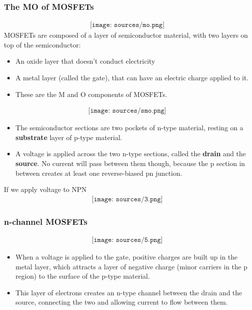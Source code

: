 \documentclass[12pt]{article}
\theoremstyle{definition}
\begin{document}
\subsubsection{The MO of MOSFETs}
\begin{align*}
    \texttt{[image: sources/mo.png]}
\end{align*}
MOSFETs are composed of a layer of semiconductor material, with two layers on top of the semiconductor:
\begin{itemize}
    \item An oxide layer that doesn't conduct electricity
    \item A metal layer (called the gate), that can have an electric charge applied to it.
    \item These are the M and O components of MOSFETs.
\end{itemize}
\begin{align*}
    \texttt{[image: sources/smo.png]}
\end{align*}
\begin{itemize}
    \item The semiconductor sections are two pockets of n-type material, resting on a \textbf{substrate} layer of p-type material.
    \item A voltage is applied across the two n-type sections, called the \textbf{drain} and the \textbf{source}. No current will pass between them though, because the p section in between creates at least one reverse-biased pn junction.
\end{itemize}
If we apply voltage to NPN
\begin{align*}
    \texttt{[image: sources/3.png]}
\end{align*}
\subsubsection{n-channel MOSFETs}
\begin{align*}
    \texttt{[image: sources/5.png]}
\end{align*}
\begin{itemize}
    \item When a voltage is applied to the gate, positive charges are built up in the metal layer, which attracts a layer of negative charge (minor carriers in the p region) to the surface of the p-type material.
    \item This layer of electrons creates an n-type channel between the drain and the source, connecting the two and allowing current to flow between them.
\end{itemize}
\end{document}
